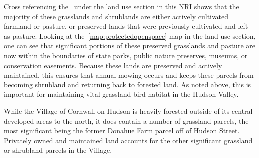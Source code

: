 Cross referencing the~ under the land use section in
this NRI shows that the majority of these grasslands and shrublands are either
actively cultivated farmland or pasture, or preserved lands that were
previously cultivated and left as pasture. Looking at the~\ref{map:protectedopenspace}
map in the land use section, one can see that significant portions
of these preserved grasslands and pasture are now within the boundaries of
state parks, public nature preserves, museums, or conservation easements.
Because these lands are preserved and actively maintained, this ensures that
annual mowing occurs and keeps these parcels from becoming shrubland and
returning back to forested land. As noted above, this is important for
maintaining vital grassland bird habitat in the Hudson Valley.

While the Village of Cornwall-on-Hudson is heavily forested outside of its
central developed areas to the north, it does contain a number of grassland
parcels, the most significant being the former Donahue Farm parcel off of
Hudson Street. Privately owned and maintained land accounts for the other
significant grassland or shrubland parcels in the Village.
~\label{map:meadowgrasslandsandshrublands}
